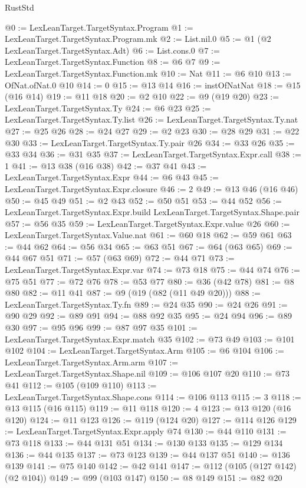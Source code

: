 \begin{lexlean}{RustStd}
\begin{coremodule}
@0 := LexLeanTarget.TargetSyntax.Program
@1 := LexLeanTarget.TargetSyntax.Program.mk
@2 := List.nil.{0}
@5 := @1 (@2 LexLeanTarget.TargetSyntax.Adt)
@6 := List.cons.{0}
@7 := LexLeanTarget.TargetSyntax.Function
@8 := @6 @7
@9 := LexLeanTarget.TargetSyntax.Function.mk
@10 := Nat
@11 := @6 @10
@13 := OfNat.ofNat.{0} @10
@14 := 0
@15 := @13 @14
@16 := instOfNatNat
@18 := @15 (@16 @14)
@19 := @11 @18
@20 := @2 @10
@22 := @9 (@19 @20)
@23 := LexLeanTarget.TargetSyntax.Ty
@24 := @6 @23
@25 := LexLeanTarget.TargetSyntax.Ty.list
@26 := LexLeanTarget.TargetSyntax.Ty.nat
@27 := @25 @26
@28 := @24 @27
@29 := @2 @23
@30 := @28 @29
@31 := @22 @30
@33 := LexLeanTarget.TargetSyntax.Ty.pair @26
@34 := @33 @26
@35 := @33 @34
@36 := @31 @35
@37 := LexLeanTarget.TargetSyntax.Expr.call
@38 := 1
@41 := @13 @38 (@16 @38)
@42 := @37 @41
@43 := LexLeanTarget.TargetSyntax.Expr
@44 := @6 @43
@45 := LexLeanTarget.TargetSyntax.Expr.closure
@46 := 2
@49 := @13 @46 (@16 @46)
@50 := @45 @49
@51 := @2 @43
@52 := @50 @51
@53 := @44 @52
@56 := LexLeanTarget.TargetSyntax.Expr.build LexLeanTarget.TargetSyntax.Shape.pair
@57 := @56 @35
@59 := LexLeanTarget.TargetSyntax.Expr.value @26
@60 := LexLeanTarget.TargetSyntax.Value.nat
@61 := @60 @18
@62 := @59 @61
@63 := @44 @62
@64 := @56 @34
@65 := @63 @51
@67 := @64 (@63 @65)
@69 := @44 @67 @51
@71 := @57 (@63 @69)
@72 := @44 @71
@73 := LexLeanTarget.TargetSyntax.Expr.var
@74 := @73 @18
@75 := @44 @74
@76 := @75 @51
@77 := @72 @76
@78 := @53 @77
@80 := @36 (@42 @78)
@81 := @8 @80
@82 := @11 @41
@87 := @9 (@19 (@82 (@11 @49 @20)))
@88 := LexLeanTarget.TargetSyntax.Ty.fn
@89 := @24 @35
@90 := @24 @26
@91 := @90 @29
@92 := @89 @91
@94 := @88 @92 @35
@95 := @24 @94
@96 := @89 @30
@97 := @95 @96
@99 := @87 @97 @35
@101 := LexLeanTarget.TargetSyntax.Expr.match @35
@102 := @73 @49
@103 := @101 @102
@104 := LexLeanTarget.TargetSyntax.Arm
@105 := @6 @104
@106 := LexLeanTarget.TargetSyntax.Arm.arm
@107 := LexLeanTarget.TargetSyntax.Shape.nil
@109 := @106 @107 @20
@110 := @73 @41
@112 := @105 (@109 @110)
@113 := LexLeanTarget.TargetSyntax.Shape.cons
@114 := @106 @113
@115 := 3
@118 := @13 @115 (@16 @115)
@119 := @11 @118
@120 := 4
@123 := @13 @120 (@16 @120)
@124 := @11 @123
@126 := @119 (@124 @20)
@127 := @114 @126
@129 := LexLeanTarget.TargetSyntax.Expr.apply @74
@130 := @44 @110
@131 := @73 @118
@133 := @44 @131 @51
@134 := @130 @133
@135 := @129 @134
@136 := @44 @135
@137 := @73 @123
@139 := @44 @137 @51
@140 := @136 @139
@141 := @75 @140
@142 := @42 @141
@147 := @112 (@105 (@127 @142) (@2 @104))
@149 := @99 (@103 @147)
@150 := @8 @149
@151 := @82 @20

\end{coremodule}
\end{lexlean}
